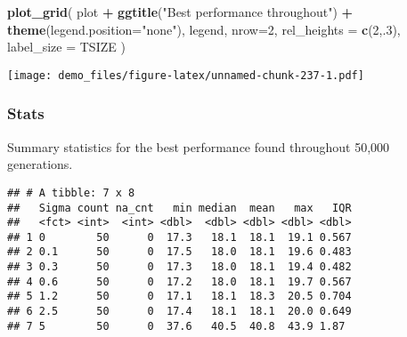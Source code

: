 \documentclass[]{book}
\newenvironment{Shaded}{\begin{snugshade}}{\end{snugshade}}
\newcommand{\DataTypeTok}[1]{\textcolor[rgb]{0.13,0.29,0.53}{#1}}
\newcommand{\DecValTok}[1]{\textcolor[rgb]{0.00,0.00,0.81}{#1}}
\newcommand{\KeywordTok}[1]{\textcolor[rgb]{0.13,0.29,0.53}{\textbf{#1}}}
\newcommand{\NormalTok}[1]{#1}
\newcommand{\OperatorTok}[1]{\textcolor[rgb]{0.81,0.36,0.00}{\textbf{#1}}}
\newcommand{\OtherTok}[1]{\textcolor[rgb]{0.56,0.35,0.01}{#1}}
\newcommand{\StringTok}[1]{\textcolor[rgb]{0.31,0.60,0.02}{#1}}
\begin{document}
\begin{Shaded}
\begin{Highlighting}[]
\KeywordTok{plot_grid}\NormalTok{(}
\NormalTok{  plot }\OperatorTok{+}
\StringTok{    }\KeywordTok{ggtitle}\NormalTok{(}\StringTok{"Best performance throughout"}\NormalTok{) }\OperatorTok{+}
\StringTok{    }\KeywordTok{theme}\NormalTok{(}\DataTypeTok{legend.position=}\StringTok{"none"}\NormalTok{),}
\NormalTok{  legend,}
  \DataTypeTok{nrow=}\DecValTok{2}\NormalTok{,}
  \DataTypeTok{rel_heights =} \KeywordTok{c}\NormalTok{(}\DecValTok{2}\NormalTok{,.}\DecValTok{3}\NormalTok{),}
  \DataTypeTok{label_size =}\NormalTok{ TSIZE}
\NormalTok{)}
\end{Highlighting}
\end{Shaded}

\texttt{[image: demo\_files/figure-latex/unnamed-chunk-237-1.pdf]}

\hypertarget{stats-45}{%
\subsubsection{Stats}\label{stats-45}}

Summary statistics for the best performance found throughout 50,000 generations.

\begin{Shaded}
\end{Shaded}

\begin{verbatim}
## # A tibble: 7 x 8
##   Sigma count na_cnt   min median  mean   max   IQR
##   <fct> <int>  <int> <dbl>  <dbl> <dbl> <dbl> <dbl>
## 1 0        50      0  17.3   18.1  18.1  19.1 0.567
## 2 0.1      50      0  17.5   18.0  18.1  19.6 0.483
## 3 0.3      50      0  17.3   18.0  18.1  19.4 0.482
## 4 0.6      50      0  17.2   18.0  18.1  19.7 0.567
## 5 1.2      50      0  17.1   18.1  18.3  20.5 0.704
## 6 2.5      50      0  17.4   18.1  18.1  20.0 0.649
## 7 5        50      0  37.6   40.5  40.8  43.9 1.87
\end{verbatim}
\end{document}
